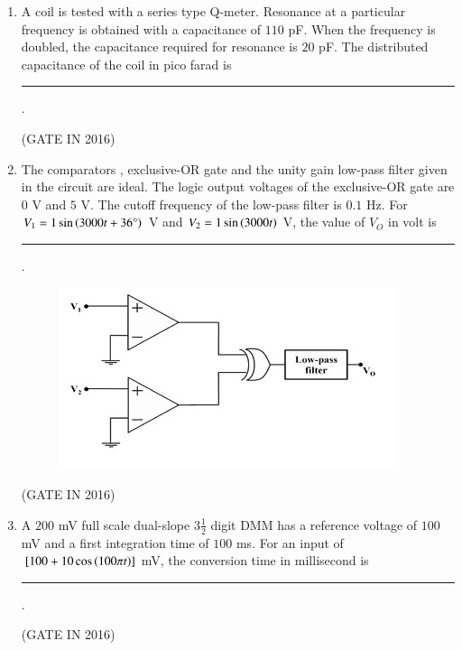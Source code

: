 \documentclass[journal,12pt,onecolumn]{IEEEtran}
\theoremstyle{remark}
\begin{document}
\begin{enumerate}
\item A coil is tested with a series type Q-meter. Resonance at a particular frequency is obtained with a capacitance of $110$ pF. When the frequency is doubled, the capacitance required for resonance is $20$ pF. The distributed capacitance of the coil in pico farad is \rule{2cm}{0.4pt}.

\hfill{(GATE IN 2016)}

\item The comparators , exclusive-OR gate and the unity gain low-pass filter given in the circuit are ideal. The logic output voltages of the exclusive-OR gate are $0$ V and $5$ V. The cutoff frequency of the low-pass filter is $0.1$ Hz. For $V_1 = 1 \sin\left(3000t + 36\degree\right)$ V and $V_2 = 1 \sin\left(3000t\right)$ V, the value of $V_O$ in volt is \rule{2cm}{0.4pt}.
\begin{figure}[H]
\centering
\includegraphics[width=0.8\columnwidth]{figs/z26.jpg}
\caption*{}
\label{fig:z26}
\end{figure}

\hfill{(GATE IN 2016)}

\item A $200$ mV full scale dual-slope $3\frac{1}{2}$ digit DMM has a reference voltage of $100$ mV and a first integration time of $100$ ms. For an input of ${}\left[100 + 10 \cos\left(100\pi t\right)\right]$ mV, the conversion time  in millisecond is \rule{2cm}{0.4pt}.

\hfill{(GATE IN 2016)}


\end{enumerate}
\end{document}
